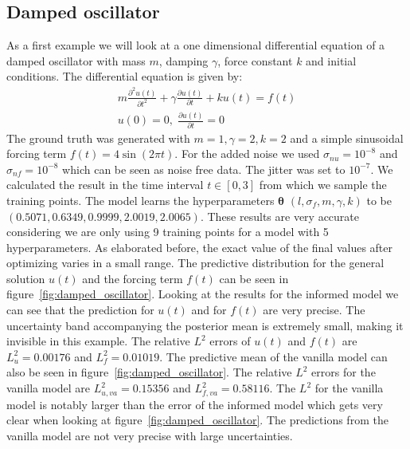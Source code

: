 \documentclass{article}
\begin{document}
\subsection{Damped oscillator}
As a first example we will look at a one dimensional differential equation of a
damped oscillator with mass $m$, damping $\gamma$, force constant $k$ and initial conditions. The
differential equation is given by:
\begin{equation}
    \begin{aligned}
        m\frac{\partial^2 u(t)}{\partial t^2} + \gamma \frac{\partial u(t)}{\partial t} + k u(t) = f(t) \\ u(0) = 0, \; \frac{\partial u(t)}{\partial t} = 0
    \end{aligned}
\end{equation}
The ground truth was generated with $m = 1, \gamma = 2, k = 2$ and a simple sinusoidal forcing term $f(t) = 4 \sin(2\pi t)$. For the added noise we used $\sigma_{nu} = 10^{-8}$ and $\sigma_{nf} = 10^{-8}$ which can be seen as noise free data. The jitter was set to $10^{-7}$. We calculated the result in the time interval $t \in [0,3]$ from which we sample the training points. The model learns the hyperparameters $\bm{\theta}$ $(l,\sigma_f,m,\gamma,k)$ to be $(0.5071, 0.6349, 0.9999, 2.0019, 2.0065)$. These results are very accurate considering we are only using 9 training points for a model with 5 hyperparameters. As elaborated before, the exact value of the final values after optimizing varies in a small range. The predictive distribution for the general solution $u(t)$ and the forcing term $f(t)$ can be seen in figure~\ref{fig:damped_oscillator}. Looking at the results for the informed model we can see that the prediction for $u(t)$ and for $f(t)$ are very precise. The uncertainty band accompanying the posterior mean is extremely small, making it invisible in this example. The relative $L^2$ errors of $u(t)$ and $f(t)$ are $L^2_u = 0.00176$ and $L^2_f = 0.01019$. The predictive mean of the vanilla model can also be seen in figure~\ref{fig:damped_oscillator}. The relative $L^2$ errors for the vanilla model are $L^2_{u,va} = 0.15356$ and $L^2_{f,va} = 0.58116$. The $L^2$ for the vanilla model is notably larger than the error of the informed model which gets very clear when looking at figure~\ref{fig:damped_oscillator}. The predictions from the vanilla model are not very precise with large uncertainties. %
\end{document}
